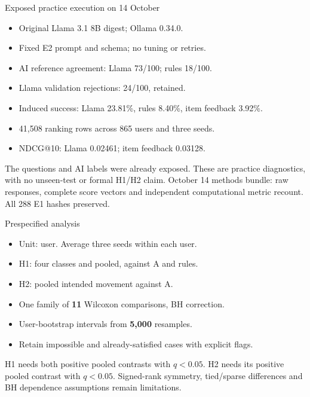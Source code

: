 \documentclass[10pt]{beamer}
\newcommand{\src}[1]{\vfill{\tiny\color{bcitgray}#1}}
\begin{document}
\begin{frame}{Exposed practice execution on 14 October}
\begin{itemize}
\item Original Llama 3.1 8B digest; Ollama 0.34.0.
\item Fixed E2 prompt and schema; no tuning or retries.
\item AI reference agreement: Llama 73/100; rules 18/100.
\item Llama validation rejections: 24/100, retained.
\item Induced success: Llama 23.81\%, rules 8.40\%, item feedback 3.92\%.
\item 41,508 ranking rows across 865 users and three seeds.
\item NDCG@10: Llama 0.02461; item feedback 0.03128.
\end{itemize}
\vspace{0.15cm}
The questions and AI labels were already exposed. These are practice diagnostics, with no unseen-test or formal H1/H2 claim.
\src{October 14 methods bundle: raw responses, complete score vectors and independent computational metric recount. All 288 E1 hashes preserved.}
\end{frame}

\begin{frame}{Prespecified analysis}
\begin{itemize}
\item Unit: user. Average three seeds within each user.
\item H1: four classes and pooled, against A and rules.
\item H2: pooled intended movement against A.
\item One family of \textbf{11} Wilcoxon comparisons, BH correction.
\item User-bootstrap intervals from \textbf{5,000} resamples.
\item Retain impossible and already-satisfied cases with explicit flags.
\end{itemize}
\vspace{0.2cm}
H1 needs both positive pooled contrasts with $q<0.05$. H2 needs its positive pooled contrast with $q<0.05$.
\src{Signed-rank symmetry, tied/sparse differences and BH dependence assumptions remain limitations.}
\end{frame}
\end{document}
